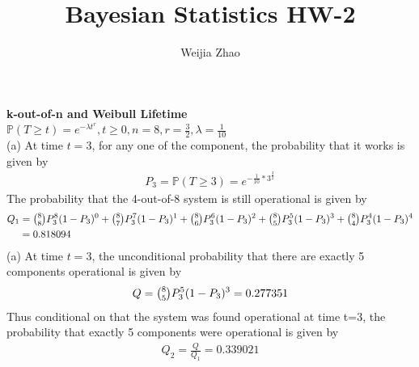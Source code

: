\documentclass{homeworg}
\title{Bayesian Statistics HW-2}
\author{Weijia Zhao}
\begin{document}
\maketitle

\exercise 
\textbf{k-out-of-n and Weibull Lifetime} \\
$\mathbb{P}(T\geq t)=e^{-\lambda t^r},t\geq 0, n=8, r=\frac{3}{2}, \lambda=\frac{1}{10}$ \\
(a) At time $t=3$, for any one of the component, the probability that it works is given by 
\begin{align*}
P_3=\mathbb{P}(T\geq 3)=e^{-\frac{1}{10}*3^{\frac{3}{2}}}
\end{align*}
The probability that the 4-out-of-8 system is still operational is given by 
\begin{align*}
Q_1&=\tbinom{8}{8}P_3^8(1-P_3)^0+\tbinom{8}{7}P_3^7(1-P_3)^1+\tbinom{8}{6}P_3^6(1-P_3)^2+\tbinom{8}{5}P_3^5(1-P_3)^3+\tbinom{8}{4}P_3^4(1-P_3)^4\\
&=0.818094
\end{align*}
(a) At time $t=3$, the unconditional probability that there are exactly 5 components operational is given by 
\begin{align*}
Q=\tbinom{8}{5}P_3^5(1-P_3)^3=0.277351
\end{align*}
Thus conditional on that the system was found operational at time t=3, the probability that exactly 5 components were operational is given by 
\begin{align*}
Q_2=\frac{Q}{Q_1}=0.339021
\end{align*}
\end{document}
